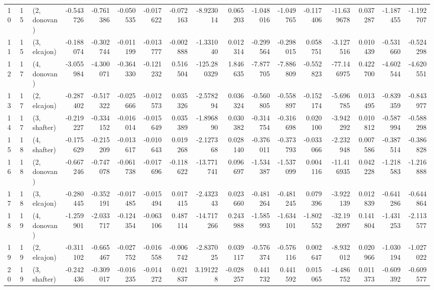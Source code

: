 \begin{tabular}{lllrrrrrrrrrrrrrr}
10 &    15 &  (2, donovan) & -0.543726 & -0.761386 &  -0.050535 & -0.017622 & -0.072163 &   -8.923014 &  0.065203 &  -1.048016 & -1.049765 & -0.117406 & -11.639678 &  0.037287 & -1.187455 & -1.192707 \\
11 &    15 &  (3, elcajon) & -0.188074 & -0.302744 &  -0.011199 & -0.013777 & -0.002888 &   -1.331040 &  0.012314 &  -0.299564 & -0.298015 &  0.058751 &  -3.127516 &  0.010439 & -0.531660 & -0.524298 \\
12 &    17 &  (4, donovan) & -3.055984 & -4.300071 &  -0.364330 & -0.121232 &  0.516504 & -125.280329 &  1.846635 &  -7.877705 & -7.886809 & -0.552823 & -77.146975 &  0.422700 & -4.602544 & -4.620551 \\
13 &    17 &  (2, elcajon) & -0.287402 & -0.517322 &  -0.025666 & -0.012573 &  0.035326 &   -2.578294 &  0.036324 &  -0.560805 & -0.558897 & -0.152174 &  -5.696785 &  0.013495 & -0.839359 & -0.843977 \\
14 &    17 &  (3, shafter) & -0.219227 & -0.334152 &  -0.016014 & -0.015649 &  0.035389 &   -1.896890 &  0.030382 &  -0.314754 & -0.316698 &  0.020100 &  -3.942292 &  0.010812 & -0.587994 & -0.588298 \\
15 &    18 &  (4, shafter) & -0.175629 & -0.215209 &  -0.013617 & -0.010643 &  0.019268 &   -2.127368 &  0.028140 &  -0.376011 & -0.373793 & -0.033066 &  -2.232948 &  0.007586 & -0.387514 & -0.386828 \\
16 &    18 &  (2, donovan) & -0.667246 & -0.747078 &  -0.061738 & -0.017696 & -0.118622 &  -13.771741 &  0.096697 &  -1.534387 & -1.537099 &  0.004116 & -11.416935 &  0.042228 & -1.218583 & -1.216888 \\
17 &    18 &  (3, elcajon) & -0.280445 & -0.352191 &  -0.017485 & -0.015494 &  0.017415 &   -2.432343 &  0.023660 &  -0.481264 & -0.481245 &  0.079396 &  -3.922139 &  0.012839 & -0.641286 & -0.644864 \\
18 &    19 &  (4, donovan) & -1.259901 & -2.033717 &  -0.124354 & -0.063106 &  0.487114 &  -14.717266 &  0.243988 &  -1.585993 & -1.634101 & -1.802552 & -32.192097 &  0.141804 & -1.431253 & -2.113577 \\
19 &    19 &  (2, elcajon) & -0.311102 & -0.665467 &  -0.027752 & -0.016558 & -0.006742 &   -2.837025 &  0.039117 &  -0.576374 & -0.576116 &  0.002647 &  -8.932012 &  0.020966 & -1.030194 & -1.027022 \\
20 &    19 &  (3, shafter) & -0.242436 & -0.309017 &  -0.016235 & -0.014272 &  0.021837 &    3.191228 & -0.028257 &   0.441732 &  0.441592 &  0.015065 &  -4.486752 &  0.011373 & -0.609392 & -0.609577 \\

\end{tabular}
